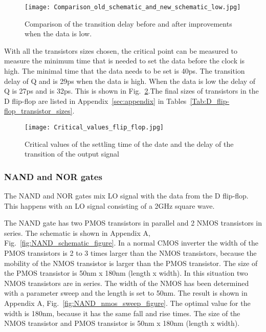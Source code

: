 \begin{figure}[h]
\texttt{[image: Comparison\_old\_schematic\_and\_new\_schematic\_low.jpg]}
\caption{ Comparison of the transition delay before and after improvements when the data is low.}
\label{fig:Comparison_old_schematic_and_new_schematic_low_figure}
\end{figure}

With all the transistors sizes chosen, the critical point can be measured to measure the minimum time that is needed to set the data before the clock is high. The minimal time that the data needs to be set is 40ps. The transition delay of Q and  is 29ps when the data is high. When the data is low the delay of Q is 27ps and  is 32ps. This is shown in Fig.~\ref{fig:Critical_values_flip_flop_figure}.The final sizes of transistors in the D flip-flop are listed in Appendix~\ref{sec:appendix} in Tables~\ref{Tab:D_flip-flop_transistor_sizes}.

\begin{figure}[h]
\texttt{[image: Critical\_values\_flip\_flop.jpg]}
\caption{ Critical values of the settling time of the date and the delay of the transition of the output signal}
\label{fig:Critical_values_flip_flop_figure}
\end{figure}

\subsubsection{NAND and NOR gates}\label{sec:frontend}
The NAND and NOR gates mix LO signal with the data from the D flip-flop. This happens with an LO signal consisting of a 2GHz square wave.

The NAND gate has two PMOS transistors in parallel and 2 NMOS transistors in series. The schematic is shown in Appendix A, Fig.~\ref{fig:NAND_schematic_figure}. In a normal CMOS inverter the width of the PMOS transistors is 2 to 3 times larger than the NMOS transistors, because the mobility of the NMOS transistor is larger than the PMOS transistor. The size of the PMOS transistor is 50nm x 180nm (length x width). In this situation two NMOS transistors are in series. The width of the NMOS has been determined with a parameter sweep and the length is set to 50nm. The result is shown in Appendix A, Fig.~\ref{fig:NAND_nmos_sweep_figure}. The optimal value for the width is 180nm, because it has the same fall and rise times. The size of the NMOS transistor and PMOS transistor is 50nm x 180nm (length x width).

